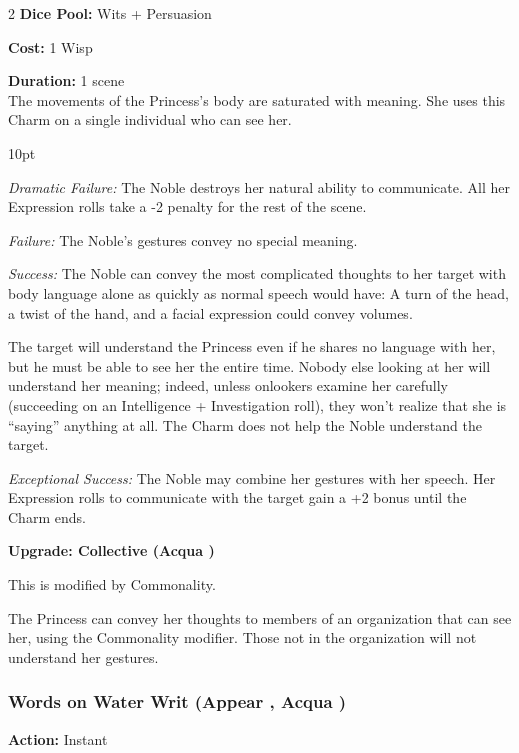 \begin{multicols}{2}
\noindent \textbf{Dice Pool:} Wits + Persuasion

\noindent \textbf{Cost:} 1 Wisp

\noindent \textbf{Duration:} 1 scene\\

\noindent The movements of the Princess's body are saturated with meaning. She uses this Charm on a single individual who can see her. 

\begin{myindentpar}{10pt}

\emph{Dramatic Failure:} The Noble destroys her natural ability to communicate. All her Expression rolls take a -2 penalty for the rest of the scene.

\emph{Failure:} The Noble’s gestures convey no special meaning.

\emph{Success:} The Noble can convey the most complicated thoughts to her target with body language alone as quickly as normal speech would have: A turn of the head, a twist of the hand, and a facial expression could convey volumes.

The target will understand the Princess even if he shares no language with her, but he must be able to see her the entire time. Nobody else looking at her will understand her meaning; indeed, unless onlookers examine her carefully (succeeding on an Intelligence + Investigation roll), they won’t realize that she is “saying” anything at all. The Charm does not help the Noble understand the target.

\emph{Exceptional Success:}  The Noble may combine her gestures with her speech. Her Expression rolls to communicate with the target gain a +2 bonus until the Charm ends.

\textbf{Upgrade: Collective (Acqua \textbullet\textbullet)}

This is modified by Commonality.

The Princess can convey her thoughts to members of an organization that can see her, using the Commonality modifier. Those not in the organization will not understand her gestures.\end{myindentpar}  

\subsubsection*{Words on Water Writ (Appear \textbullet\textbullet, Acqua \textbullet)}

\noindent \textbf{Action:} Instant


\end{multicols}
